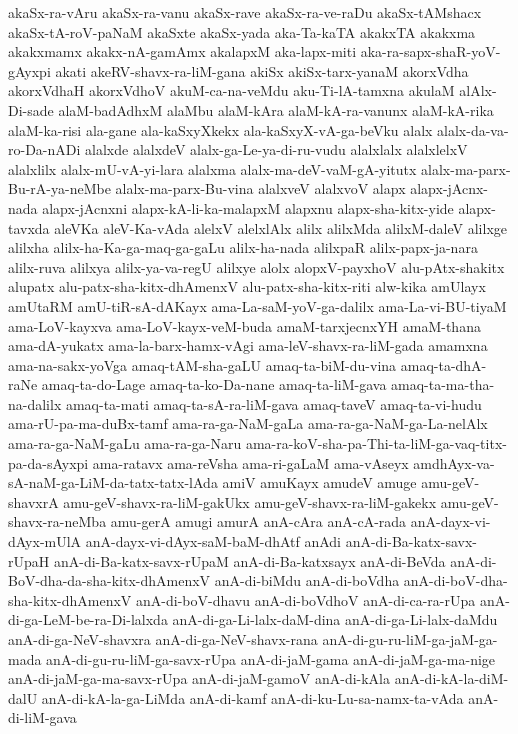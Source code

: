 {akaSx-ra-vAru
akaSx-ra-vanu
akaSx-rave
akaSx-ra-ve-raDu
akaSx-tAMshacx
akaSx-tA-roV-paNaM
akaSxte
akaSx-yada
aka-Ta-kaTA
akakxTA
akakxma
akakxmamx
akakx-nA-gamAmx
akalapxM
aka-lapx-miti
aka-ra-sapx-shaR-yoV-gAyxpi
akati
akeRV-shavx-ra-liM-gana
akiSx
akiSx-tarx-yanaM
akorxVdha
akorxVdhaH
akorxVdhoV
akuM-ca-na-veMdu
aku-Ti-lA-tamxna
akulaM
alAlx-Di-sade
alaM-badAdhxM
alaMbu
alaM-kAra
alaM-kA-ra-vanunx
alaM-kA-rika
alaM-ka-risi
ala-gane
ala-kaSxyXkekx
ala-kaSxyX-vA-ga-beVku
alalx
alalx-da-va-ro-Da-nADi
alalxde
alalxdeV
alalx-ga-Le-ya-di-ru-vudu
alalxlalx
alalxlelxV
alalxlilx
alalx-mU-vA-yi-lara
alalxma
alalx-ma-deV-vaM-gA-yitutx
alalx-ma-parx-Bu-rA-ya-neMbe
alalx-ma-parx-Bu-vina
alalxveV
alalxvoV
alapx
alapx-jAcnx-nada
alapx-jAcnxni
alapx-kA-li-ka-malapxM
alapxnu
alapx-sha-kitx-yide
alapx-tavxda
aleVKa
aleV-Ka-vAda
alelxV
alelxlAlx
alilx
alilxMda
alilxM-daleV
alilxge
alilxha
alilx-ha-Ka-ga-maq-ga-gaLu
alilx-ha-nada
alilxpaR
alilx-papx-ja-nara
alilx-ruva
alilxya
alilx-ya-va-regU
alilxye
alolx
alopxV-payxhoV
alu-pAtx-shakitx
alupatx
alu-patx-sha-kitx-dhAmenxV
alu-patx-sha-kitx-riti
alw-kika
amUlayx
amUtaRM
amU-tiR-sA-dAKayx
ama-La-saM-yoV-ga-dalilx
ama-La-vi-BU-tiyaM
ama-LoV-kayxva
ama-LoV-kayx-veM-buda
amaM-tarxjecnxYH
amaM-thana
ama-dA-yukatx
ama-la-barx-hamx-vAgi
ama-leV-shavx-ra-liM-gada
amamxna
ama-na-sakx-yoVga
amaq-tAM-sha-gaLU
amaq-ta-biM-du-vina
amaq-ta-dhA-raNe
amaq-ta-do-Lage
amaq-ta-ko-Da-nane
amaq-ta-liM-gava
amaq-ta-ma-tha-na-dalilx
amaq-ta-mati
amaq-ta-sA-ra-liM-gava
amaq-taveV
amaq-ta-vi-hudu
ama-rU-pa-ma-duBx-tamf
ama-ra-ga-NaM-gaLa
ama-ra-ga-NaM-ga-La-nelAlx
ama-ra-ga-NaM-gaLu
ama-ra-ga-Naru
ama-ra-koV-sha-pa-Thi-ta-liM-ga-vaq-titx-pa-da-sAyxpi
ama-ratavx
ama-reVsha
ama-ri-gaLaM
ama-vAseyx
amdhAyx-va-sA-naM-ga-LiM-da-tatx-tatx-lAda
amiV
amuKayx
amudeV
amuge
amu-geV-shavxrA
amu-geV-shavx-ra-liM-gakUkx
amu-geV-shavx-ra-liM-gakekx
amu-geV-shavx-ra-neMba
amu-gerA
amugi
amurA
anA-cAra
anA-cA-rada
anA-dayx-vi-dAyx-mUlA
anA-dayx-vi-dAyx-saM-baM-dhAtf
anAdi
anA-di-Ba-katx-savx-rUpaH
anA-di-Ba-katx-savx-rUpaM
anA-di-Ba-katxsayx
anA-di-BeVda
anA-di-BoV-dha-da-sha-kitx-dhAmenxV
anA-di-biMdu
anA-di-boVdha
anA-di-boV-dha-sha-kitx-dhAmenxV
anA-di-boV-dhavu
anA-di-boVdhoV
anA-di-ca-ra-rUpa
anA-di-ga-LeM-be-ra-Di-lalxda
anA-di-ga-Li-lalx-daM-dina
anA-di-ga-Li-lalx-daMdu
anA-di-ga-NeV-shavxra
anA-di-ga-NeV-shavx-rana
anA-di-gu-ru-liM-ga-jaM-ga-mada
anA-di-gu-ru-liM-ga-savx-rUpa
anA-di-jaM-gama
anA-di-jaM-ga-ma-nige
anA-di-jaM-ga-ma-savx-rUpa
anA-di-jaM-gamoV
anA-di-kAla
anA-di-kA-la-diM-dalU
anA-di-kA-la-ga-LiMda
anA-di-kamf
anA-di-ku-Lu-sa-namx-ta-vAda
anA-di-liM-gava
}
